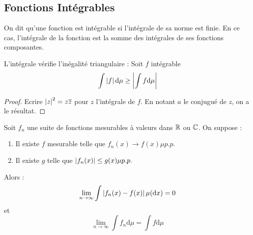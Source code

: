 \documentclass{cours}
\begin{document}
\subsection{Fonctions Intégrables}
\begin{definition}
    On dit qu'une fonction est intégrable si l'intégrale de sa norme est finie. En ce cas, l'intégrale de la fonction est la somme des intégrales de ses fonctions composantes.
\end{definition}
\begin{theorem}
    L'intégrale vérifie l'inégalité triangulaire : Soit $f$ intégrable
    \[
        \int \left|f\right| \mathrm{d}\mu \geq \left|\int f \mathrm{d}\mu\right|
    \]
\end{theorem}
\begin{proof}
    Ecrire $\left|z\right|^{2} = z\overline{z}$ pour $z$ l'intégrale de $f$. En notant $a$ le conjugué de $z$, on a le résultat.
\end{proof}

\begin{theorem}\label{TCD}
    Soit $f_{n}$ une suite de fonctions mesurables à valeurs dans $\mathbb{R}$ ou $\mathbb{C}$. On suppose :
    \begin{enumerate}
        \item Il existe $f$ mesurable telle que $f_{n}(x) \to f(x) \mu p.p.$
        \item Il existe $g$ telle que $\left|f_{n}(x)\right| \leq g(x) \mu p.p.$
    \end{enumerate}
    Alors :
    \[
        \lim_{n\to \infty} \int \left|f_{n}(x) - f(x)\right| \mu(\mathrm{d}x) = 0
    \]
    et
    \[
        \lim_{n \to \infty} \int f_{n} \mathrm{d}\mu = \int f \mathrm{d}\mu
    \]
\end{theorem}
\end{document}
